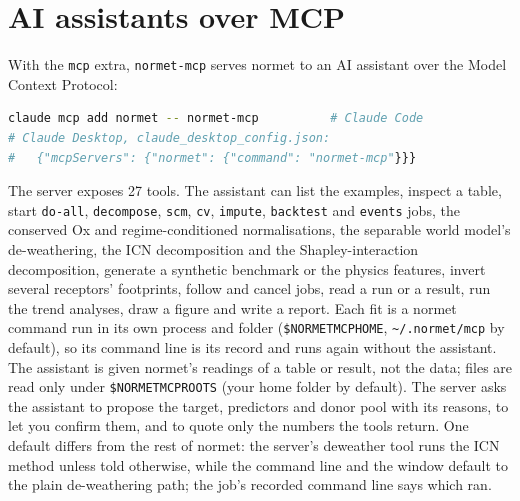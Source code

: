 \documentclass[11pt]{report}
\newcommand{\nm}{\textsf{normet}}
\newcommand{\codeunderscore}{\textunderscore\allowbreak}
\newcommand{\code}[1]{\texttt{\let\_\codeunderscore #1}}
\begin{document}
\section{AI assistants over MCP}\label{sec:mcp}
With the \code{mcp} extra, \code{normet-mcp} serves \nm{} to an AI assistant over the
Model Context Protocol:
\begin{lstlisting}[language=bash]
claude mcp add normet -- normet-mcp          # Claude Code
# Claude Desktop, claude_desktop_config.json:
#   {"mcpServers": {"normet": {"command": "normet-mcp"}}}
\end{lstlisting}
The server exposes 27 tools. The assistant can list the examples, inspect a table,
start \code{do-all}, \code{decompose}, \code{scm}, \code{cv}, \code{impute},
\code{backtest} and \code{events} jobs, the conserved Ox and regime-conditioned
normalisations, the separable world model's de-weathering, the ICN decomposition
and the Shapley-interaction decomposition,
generate a synthetic benchmark or the physics features, invert several receptors'
footprints, follow and cancel jobs, read a run or a result, run the trend analyses,
draw a figure and write a report. Each fit is a \nm{} command run in its own
process and folder (\code{\$NORMET\_MCP\_HOME}, \code{\textasciitilde/.normet/mcp} by
default), so its command line is its record and runs again without the assistant. The
assistant is given \nm{}'s readings of a table or result, not the data; files are read
only under \code{\$NORMET\_MCP\_ROOTS} (your home folder by default). The server asks the
assistant to propose the target, predictors and donor pool with its reasons, to let you
confirm them, and to quote only the numbers the tools return. One default differs from
the rest of \nm{}: the server's deweather tool runs the ICN method unless told
otherwise, while the command line and the window default to the plain de-weathering
path; the job's recorded command line says which ran.

\appendix
\end{document}
